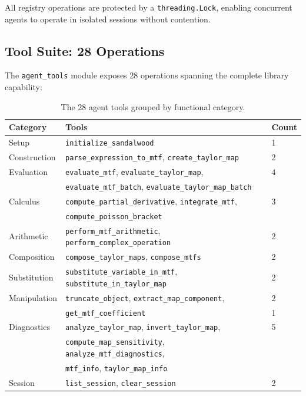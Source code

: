 \documentclass[aps,prb,reprint,superscriptaddress,nofootinbib]{revtex4-2}
\begin{document}
All registry operations are protected by a \texttt{threading.Lock}, enabling concurrent agents to operate in isolated sessions without contention.

\subsection{Tool Suite: 28 Operations}

The \texttt{agent\_tools} module exposes 28 operations spanning the complete library capability:

\begin{table}
\centering
\begin{tabular}{lll}
\toprule
\textbf{Category} & \textbf{Tools} & \textbf{Count} \\
\midrule
Setup & \texttt{initialize\_sandalwood} & 1 \\
Construction & \texttt{parse\_expression\_to\_mtf}, \texttt{create\_taylor\_map} & 2 \\
Evaluation & \texttt{evaluate\_mtf}, \texttt{evaluate\_taylor\_map}, & 4 \\
 & \texttt{evaluate\_mtf\_batch}, \texttt{evaluate\_taylor\_map\_batch} & \\
Calculus & \texttt{compute\_partial\_derivative}, \texttt{integrate\_mtf}, & 3 \\
 & \texttt{compute\_poisson\_bracket} & \\
Arithmetic & \texttt{perform\_mtf\_arithmetic}, \texttt{perform\_complex\_operation} & 2 \\
Composition & \texttt{compose\_taylor\_maps}, \texttt{compose\_mtfs} & 2 \\
Substitution & \texttt{substitute\_variable\_in\_mtf}, \texttt{substitute\_in\_taylor\_map} & 2 \\
Manipulation & \texttt{truncate\_object}, \texttt{extract\_map\_component}, & 2 \\
 & \texttt{get\_mtf\_coefficient} & 1 \\
Diagnostics & \texttt{analyze\_taylor\_map}, \texttt{invert\_taylor\_map}, & 5 \\
 & \texttt{compute\_map\_sensitivity}, \texttt{analyze\_mtf\_diagnostics}, & \\
 & \texttt{mtf\_info}, \texttt{taylor\_map\_info} & \\
Session & \texttt{list\_session}, \texttt{clear\_session} & 2 \\
\bottomrule
\end{tabular}
\caption{The 28 agent tools grouped by functional category.}
\label{tab:tools}
\end{table}
\end{document}
